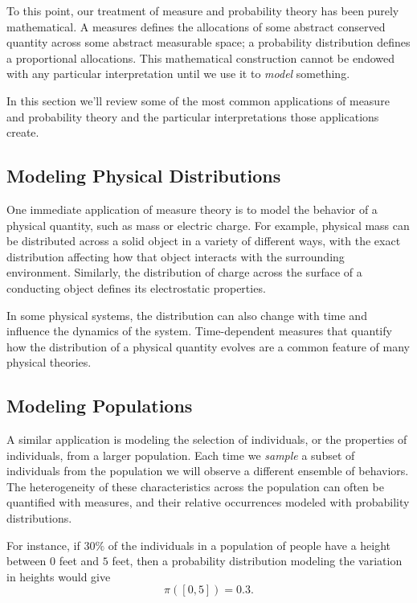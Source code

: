 \documentclass[
  letterpaper,
  DIV=11,
  numbers=noendperiod]{scrartcl}
\begin{document}
To this point, our treatment of measure and probability theory has been
purely mathematical. A measures defines the allocations of some abstract
conserved quantity across some abstract measurable space; a probability
distribution defines a proportional allocations. This mathematical
construction cannot be endowed with any particular interpretation until
we use it to \emph{model} something.

In this section we'll review some of the most common applications of
measure and probability theory and the particular interpretations those
applications create.

\subsection{Modeling Physical
Distributions}\label{modeling-physical-distributions}

One immediate application of measure theory is to model the behavior of
a physical quantity, such as mass or electric charge. For example,
physical mass can be distributed across a solid object in a variety of
different ways, with the exact distribution affecting how that object
interacts with the surrounding environment. Similarly, the distribution
of charge across the surface of a conducting object defines its
electrostatic properties.

In some physical systems, the distribution can also change with time and
influence the dynamics of the system. Time-dependent measures that
quantify how the distribution of a physical quantity evolves are a
common feature of many physical theories.

\subsection{Modeling Populations}\label{modeling-populations}

A similar application is modeling the selection of individuals, or the
properties of individuals, from a larger population. Each time we
\emph{sample} a subset of individuals from the population we will
observe a different ensemble of behaviors. The heterogeneity of these
characteristics across the population can often be quantified with
measures, and their relative occurrences modeled with probability
distributions.

For instance, if \(30\%\) of the individuals in a population of people
have a height between \(0\) feet and \(5\) feet, then a probability
distribution modeling the variation in heights would give \[
\pi([0, 5]) = 0.3.
\]
\end{document}

